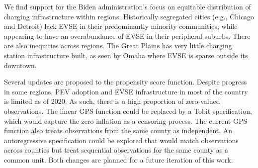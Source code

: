 \documentclass[
  letterpaper,
  DIV=11,
  numbers=noendperiod]{scrartcl}
\begin{document}
We find support for the Biden administration's focus on equitable
distribution of charging infrastructure within regions. Historically
segregated cities (e.g., Chicago and Detroit) lack EVSE in their
predominantly minority communities, while appearing to have an
overabundance of EVSE in their peripheral suburbs. There are also
inequities across regions. The Great Plains has very little charging
station infrastructure built, as seen by Omaha where EVSE is sparse
outside its downtown.

Several updates are proposed to the propensity score function. Despite
progress in some regions, PEV adoption and EVSE infrastructure in most
of the country is limited as of 2020. As such, there is a high
proportion of zero-valued observations. The linear GPS function could be
replaced by a Tobit specification, which would capture the zero
inflation as a censoring process. The current GPS function also treats
observations from the same county as independent. An autoregressive
specification could be explored that would match observations across
counties but treat sequential observations for the same county as a
common unit. Both changes are planned for a future iteration of this
work.
\end{document}
